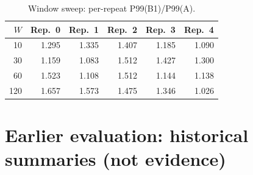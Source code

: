 \documentclass[10pt,a4paper]{article}
\begin{document}
\begin{table}[h]
\centering\small
\caption{Window sweep: per-repeat P99(B1)/P99(A).}\label{tab:win_rep}
\begin{tabular}{rrrrrr}
\toprule
$W$ & Rep.~0 & Rep.~1 & Rep.~2 & Rep.~3 & Rep.~4 \\
\midrule
10 & 1.295 & 1.335 & 1.407 & 1.185 & 1.090 \\
30 & 1.159 & 1.083 & 1.512 & 1.427 & 1.300 \\
60 & 1.523 & 1.108 & 1.512 & 1.144 & 1.138 \\
120 & 1.657 & 1.573 & 1.475 & 1.346 & 1.026 \\
\bottomrule
\end{tabular}
\end{table}

\section{Earlier evaluation: historical summaries (not evidence)}
\label{sec:breadth}
\end{document}
